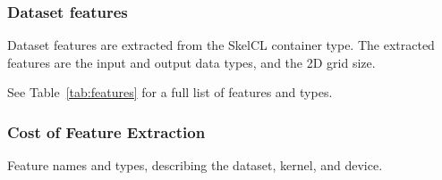 

\subsubsection{Dataset features}

Dataset features are extracted from the SkelCL container type. The
extracted features are the input and output data types, and the 2D
grid size.

See Table~\ref{tab:features} for a full list of features and
types.

\subsubsection{Cost of Feature Extraction}


\begin{table}

\caption{Feature names and types, describing the dataset, kernel,
  and device.}
\label{tab:features}
\end{table}


